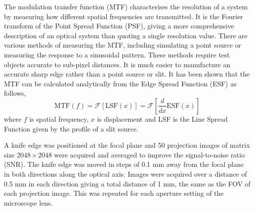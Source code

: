 The modulation transfer function (MTF) characterises the resolution of a system by measuring how different spatial frequencies are transmitted.
It is the Fourier transform of the Point Spread Function (PSF), giving a more comprehensive description of an optical system than quoting a single  resolution value. There are various methods of measuring the MTF, including simulating a point source or measuring the response to a sinusoidal pattern. These methods require test objects accurate to sub-pixel distances. 
It is much easier to manufacture an accurate  sharp edge rather than  a point source or slit. It has been shown that the MTF can be calculated analytically from the Edge Spread Function (ESF) as follows,
\begin{equation}
\mathrm{MTF}(f) = \mathscr{F}\left[\mathrm{LSF}(x)\right] = \mathscr{F}\left[\frac{d}{dx}\mathrm{ESF}(x)\right]
\label{eqn:MTF_ESF}
\end{equation}
where $f$ is spatial frequency, $x$ is displacement and LSF is the Line Spread Function given by the profile of a slit source. \cite{Boone:1986}


A knife edge was positioned at the focal plane and 50 projection images of matrix size $2048 \times 2048$ were acquired and averaged to improve the signal-to-noise ratio (SNR). The knife edge was moved in steps of 0.1 mm away from the focal plane in both directions along the optical axis.  Images were acquired over a distance of 0.5 mm in each direction giving a total distance of 1 mm, the same as the FOV of each projection image. This was repeated for each aperture setting of the microscope lens.






